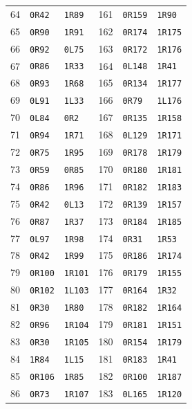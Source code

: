 \begin{longtable}{@{}rll@{\hspace{2em}}rll@{}}
64 & \texttt{0R42} & \texttt{1R89} & 161 & \texttt{0R159} & \texttt{1R90}\\
65 & \texttt{0R90} & \texttt{1R91} & 162 & \texttt{0R174} & \texttt{1R175}\\
66 & \texttt{0R92} & \texttt{0L75} & 163 & \texttt{0R172} & \texttt{1R176}\\
67 & \texttt{0R86} & \texttt{1R33} & 164 & \texttt{0L148} & \texttt{1R41}\\
68 & \texttt{0R93} & \texttt{1R68} & 165 & \texttt{0R134} & \texttt{1R177}\\
69 & \texttt{0L91} & \texttt{1L33} & 166 & \texttt{0R79} & \texttt{1L176}\\
70 & \texttt{0L84} & \texttt{0R2} & 167 & \texttt{0R135} & \texttt{1R158}\\
71 & \texttt{0R94} & \texttt{1R71} & 168 & \texttt{0L129} & \texttt{1R171}\\
72 & \texttt{0R75} & \texttt{1R95} & 169 & \texttt{0R178} & \texttt{1R179}\\
73 & \texttt{0R59} & \texttt{0R85} & 170 & \texttt{0R180} & \texttt{1R181}\\
74 & \texttt{0R86} & \texttt{1R96} & 171 & \texttt{0R182} & \texttt{1R183}\\
75 & \texttt{0R42} & \texttt{0L13} & 172 & \texttt{0R139} & \texttt{1R157}\\
76 & \texttt{0R87} & \texttt{1R37} & 173 & \texttt{0R184} & \texttt{1R185}\\
77 & \texttt{0L97} & \texttt{1R98} & 174 & \texttt{0R31} & \texttt{1R53}\\
78 & \texttt{0R42} & \texttt{1R99} & 175 & \texttt{0R186} & \texttt{1R174}\\
79 & \texttt{0R100} & \texttt{1R101} & 176 & \texttt{0R179} & \texttt{1R155}\\
80 & \texttt{0R102} & \texttt{1L103} & 177 & \texttt{0R164} & \texttt{1R32}\\
81 & \texttt{0R30} & \texttt{1R80} & 178 & \texttt{0R182} & \texttt{1R164}\\
82 & \texttt{0R96} & \texttt{1R104} & 179 & \texttt{0R181} & \texttt{1R151}\\
83 & \texttt{0R30} & \texttt{1R105} & 180 & \texttt{0R154} & \texttt{1R179}\\
84 & \texttt{1R84} & \texttt{1L15} & 181 & \texttt{0R183} & \texttt{1R41}\\
85 & \texttt{0R106} & \texttt{1R85} & 182 & \texttt{0R100} & \texttt{1R187}\\
86 & \texttt{0R73} & \texttt{1R107} & 183 & \texttt{0L165} & \texttt{1R120}\\

\end{longtable}
